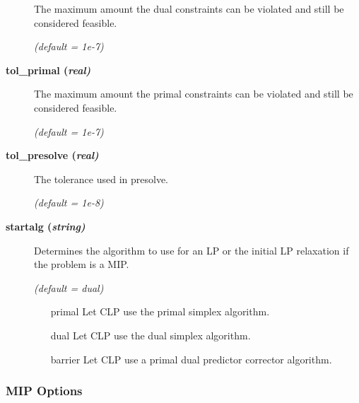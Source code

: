 \begin{description}
The maximum amount the dual constraints can be violated and still be considered feasible.

\textsl{(default = 1e-7)}

\item[\label{tol_primal}\hypertarget{tol_primal}
{\textbf{tol\_primal (\slshape{real})}}]\hspace{1.0in}

The maximum amount the primal constraints can be violated and still be considered feasible.

\textsl{(default = 1e-7)}

\item[\label{tol_presolve}\hypertarget{tol_presolve}
{\textbf{tol\_presolve (\slshape{real})}}]\hspace{1.0in}

The tolerance used in presolve.

\textsl{(default = 1e-8)}

\item[\label{startalg}\hypertarget{startalg}
{\textbf{startalg (\slshape{string})}}]\hspace{1.0in}

Determines the algorithm to use for an LP or the initial LP relaxation if the problem is a MIP.

\textsl{(default = dual)}
\begin{itemize}
\item[primal] 
Let CLP use the primal simplex algorithm.
\item[dual] 
Let CLP use the dual simplex algorithm.
\item[barrier] 
Let CLP use a primal dual predictor corrector algorithm.
\end{itemize}

\end{description}

\subsubsection{MIP Options}

